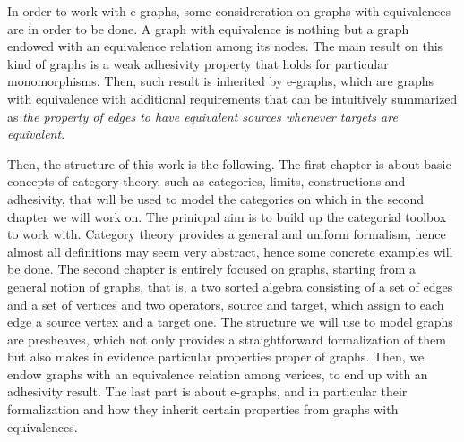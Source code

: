 
In order to work with e-graphs, some considreration on graphs with equivalences are in order to be done. A graph with equivalence is nothing but a graph endowed with an equivalence relation among its nodes. The main result on this kind of graphs is a weak adhesivity property that holds for particular monomorphisms. Then, such result is inherited by e-graphs, which are graphs with equivalence with additional requirements that can be intuitively summarized as \textit{the property of edges to have equivalent sources whenever targets are equivalent}.

Then, the structure of this work is the following.
The first chapter is about basic concepts of category theory, such as categories, limits, constructions and adhesivity, that will be used to model the categories on which in the second chapter we will work on.
The prinicpal aim is to build up the categorial toolbox to work with. Category theory provides a general and uniform formalism, hence almost all definitions may seem very abstract, hence some concrete examples will be done.
The second chapter is entirely focused on graphs, starting from a general notion of graphs, that is, a two sorted algebra consisting of a set of edges and a set of vertices and two operators, source and target, which assign to each edge a source vertex and a target one.
The structure we will use to model graphs are presheaves, which not only provides a straightforward formalization of them but also makes in evidence particular properties proper of graphs.
Then, we endow graphs with an equivalence relation among verices, to end up with an adhesivity result.
The last part is about e-graphs, and in particular their formalization and how they inherit certain properties from graphs with equivalences.


